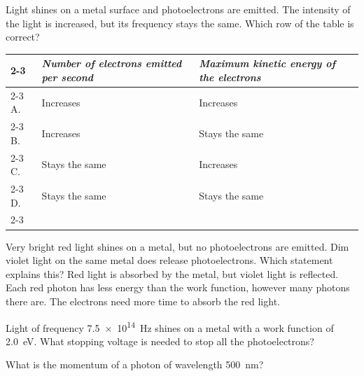 \begin{quizq}{}
Light shines on a metal surface and photoelectrons are emitted. The intensity of the light is increased,
but its frequency stays the same. Which row of the table is correct?
\begin{center}
  \renewcommand\arraystretch{1.7}
  \begin{tabular}{@{}p{10mm}|>{\centering\arraybackslash}p{55mm}|>{\centering\arraybackslash}p{55mm}|}
    \cline{2-3}
    & \textit{Number of electrons emitted per second} & \textit{Maximum kinetic energy of the electrons}\\ \cline{2-3}
    A. & Increases & Increases\\ \cline{2-3}
    B. & Increases & Stays the same\\ \cline{2-3}
    C. & Stays the same & Increases\\ \cline{2-3}
    D. & Stays the same & Stays the same\\ \cline{2-3}
  \end{tabular}
\end{center}
\end{quizq}

\begin{quizq}{}
Very bright red light shines on a metal, but no photoelectrons are emitted. Dim violet light on the same
metal does release photoelectrons. Which statement explains this?
  {Red light is absorbed by the metal, but violet light is reflected.}
  {Each red photon has less energy than the work function, however many photons there are.}
  {The electrons need more time to absorb the red light.}
\end{quizq}

\begin{quizq}{}
Light of frequency \qty{7.5e14}{Hz} shines on a metal with a work function of \qty{2.0}{eV}. What stopping
voltage is needed to stop all the photoelectrons?
\end{quizq}

\begin{quizq}{}
What is the momentum of a photon of wavelength \qty{500}{nm}?
\end{quizq}

